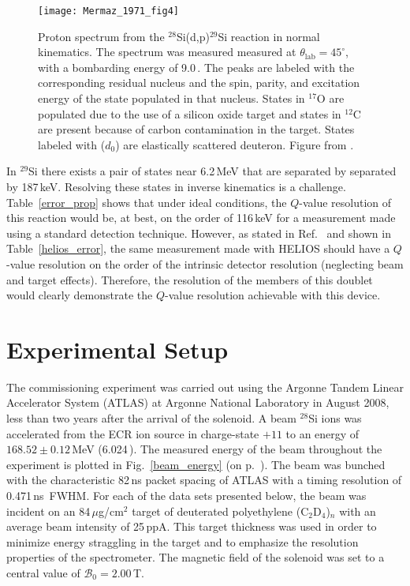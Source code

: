 \begin{figure}%
\centering
\texttt{[image: Mermaz\_1971\_fig4]}%
\caption[Proton spectrum from the $^{28}$Si(d,p)$^{29}$Si reaction in normal kinematics]{Proton spectrum from the $^{28}$Si(d,p)$^{29}$Si reaction in normal kinematics.  The spectrum was measured measured at $\theta_\mathrm{lab}=45^\circ$, with a bombarding energy of 9.0\,\AMeV.  The peaks are labeled with the corresponding residual nucleus and the spin, parity, and excitation energy of the state populated in that nucleus.  States in $^{17}$O are populated due to the use of a silicon oxide target and states in $^{12}$C are present because of carbon contamination in the target.  States labeled with ($d_0$) are elastically scattered deuteron.  Figure from \citet[Fig.~1]{Mermaz_1971}.}%
\label{nor_kin_spec}%
\end{figure}  
  
In $^{29}$Si there exists a pair of states near 6.2\,MeV that are separated by separated by 187\,keV.  Resolving these states in inverse kinematics is a challenge.  Table~\ref{error_prop} shows that under ideal conditions, the $Q$-value resolution of this reaction would be, at best, on the order of 116\,keV for a measurement made using a standard detection technique.  However, as stated in Ref.~\cite{Wuosmaa_2007} and shown in Table~\ref{helios_error}, the same measurement made with HELIOS should have a $Q$-value resolution on the order of the intrinsic detector resolution (neglecting beam and target effects).  Therefore, the resolution of the members of this doublet would clearly demonstrate the $Q$-value resolution achievable with this device.

\section{Experimental Setup}
The commissioning experiment was carried out using the Argonne Tandem Linear Accelerator System (ATLAS) at Argonne National Laboratory in August 2008, less than two years after the arrival of the solenoid.  A beam $^{28}$Si ions was accelerated from the ECR ion source in charge-state $+11$ to an energy of $168.52\pm0.12$\,MeV (6.024\,\AMeV{}).  The measured energy of the beam throughout the experiment is plotted in Fig.~\ref{beam_energy} (on p.~\pageref{beam_energy}). The beam was bunched with the characteristic 82\,ns packet spacing of ATLAS with a timing resolution of 0.471\,ns~FWHM. For each of the data sets presented below, the beam was incident on an 84\,$\mu$g/cm$^2$ target of deuterated polyethylene (C$_2$D$_4$)$_n$ with an average beam intensity of 25\,ppA.  This target thickness was used in order to minimize energy straggling in the target and to emphasize the resolution properties of the spectrometer.  The magnetic field of the solenoid was set to a central value of $\mathscr{B}_0=2.00$\,T.  

